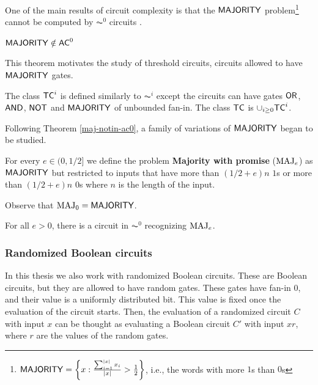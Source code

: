 One of the main results of circuit complexity is that the $\mathsf{MAJORITY}$ problem\footnote{$\mathsf{MAJORITY} = \left\{x : \frac{\sum_{i=1}^{|x|} x_i}{|x|} > \frac{1}{2}\right\}$, i.e., the words with more $1$s than $0$s} cannot be computed by $\AC^0$ circuits \citep{furst1984parity}.

\begin{theorem}\label{maj-notin-ac0}
    $\mathsf{MAJORITY} \notin \mathsf{AC}^0$
\end{theorem}

This theorem motivates the study of threshold circuits, circuits allowed to have $\mathsf{MAJORITY}$ gates.


\begin{definition}[$\TC$]
    The class $\mathsf{TC}^i$ is defined similarly to $\AC^i$ except the circuits can have gates $\mathsf{OR}$, $\mathsf{AND}$, $\mathsf{NOT}$ and $\mathsf{MAJORITY}$ of unbounded fan-in.
    The class $\TC$ is $\cup_{i \geq 0}\mathsf{TC}^i$.
\end{definition}


Following Theorem \ref{maj-notin-ac0}, a family of variations of $\mathsf{MAJORITY}$ began to be studied.

\begin{definition}
    For every $e \in (0, 1/2]$ we define the problem \textbf{Majority with promise} ($\text{MAJ}_{e}$) as $\mathsf{MAJORITY}$ but restricted to inputs that have more than $(1/2 + e)n$ $1$s or more than $(1/2 + e)n$ $0$s where $n$ is the length of the input.

    Observe that $\text{MAJ}_{0} = \mathsf{MAJORITY}$.
\end{definition}

\begin{theorem}\label{theo:promised-majority}
    For all $e > 0$, there is a circuit in $\AC^0$ recognizing $\text{MAJ}_{e}$.
\end{theorem}




\subsubsection{Randomized Boolean circuits}


In this thesis we also work with randomized Boolean circuits.
These are Boolean circuits, but they are allowed to have random gates.
These gates have fan-in $0$, and their value is a uniformly distributed bit.
This value is fixed once the evaluation of the circuit starts.
Then, the evaluation of a randomized circuit $C$ with input $x$ can be thought as evaluating a Boolean circuit $C'$ with input $x r$, where $r$ are the values of the random gates.

